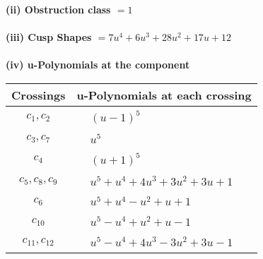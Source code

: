 \documentclass[1p]{elsarticle_modified}
\theoremstyle{definition}
\begin{document}
\flushleft \textbf{(ii) Obstruction class $= 1$}\\~\\
\flushleft \textbf{(iii) Cusp Shapes $= 7 u^4+6 u^3+28 u^2+17 u+12$}\\~\\
\newpage\renewcommand{\arraystretch}{1}
\flushleft \textbf{(iv) u-Polynomials at the component}\newline \\
\begin{tabular}{m{50pt}|m{274pt}}
Crossings & \hspace{64pt}u-Polynomials at each crossing \\
\hline $$\begin{aligned}c_{1},c_{2}\end{aligned}$$&$\begin{aligned}
&(u-1)^5
\end{aligned}$\\
\hline $$\begin{aligned}c_{3},c_{7}\end{aligned}$$&$\begin{aligned}
&u^5
\end{aligned}$\\
\hline $$\begin{aligned}c_{4}\end{aligned}$$&$\begin{aligned}
&(u+1)^5
\end{aligned}$\\
\hline $$\begin{aligned}c_{5},c_{8},c_{9}\end{aligned}$$&$\begin{aligned}
&u^5+u^4+4 u^3+3 u^2+3 u+1
\end{aligned}$\\
\hline $$\begin{aligned}c_{6}\end{aligned}$$&$\begin{aligned}
&u^5+u^4- u^2+u+1
\end{aligned}$\\
\hline $$\begin{aligned}c_{10}\end{aligned}$$&$\begin{aligned}
&u^5- u^4+u^2+u-1
\end{aligned}$\\
\hline $$\begin{aligned}c_{11},c_{12}\end{aligned}$$&$\begin{aligned}
&u^5- u^4+4 u^3-3 u^2+3 u-1
\end{aligned}$\\
\hline
\end{tabular}\\~\\
\end{document}
